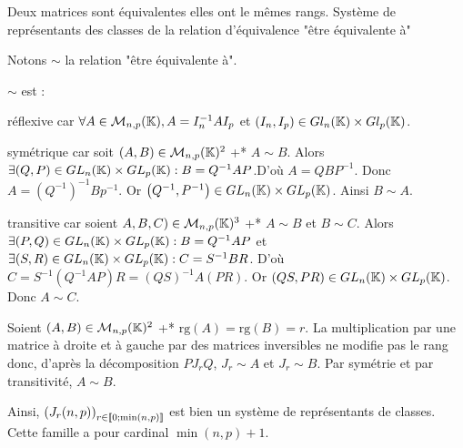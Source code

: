 \documentclass{article}
\begin{document}
\begin{question_kholle}[{
				Soient $(A, B) \in \mathcal{M}_{n, p}(\mathbb{K})^2$. $A$ est équivalente à $B$ s'il existe $(P, Q) \in GL_n(\K) \times GL_p(\K)$ \tq* $B = Q^{-1} A P$.

				Montrons que deux matrices sont équivalentes \ssi elles ont le mêmes rangs, que "être équivalente à" est une relation d'équivalence, qu'il y a $\min(n, p) + 1$ classes et que $\left(J_r(n, p)\right)_{r \in \lient 0; \min(n, p) \rient}$ est un système de représentants de classes.
			}]
	{Deux matrices sont équivalentes \ssi elles ont le mêmes rangs. Système de représentants des classes de la relation d'équivalence "être équivalente à"}

	Notons $\sim$ la relation "être équivalente à".

	$\sim$ est :
	\begin{liste}
		\item réflexive car $\forall A \in \mathcal{M}_{n, p}(\mathbb K), A = I_n^{-1} A I_p$ et $(I_n, I_p) \in Gl_n(\mathbb K) \times Gl_p(\mathbb K)$.
		\item symétrique car soit $(A, B) \in \mathcal{M}_{n, p}(\mathbb K)^2$ \tq+* $A \sim B$.
		Alors $\exists (Q, P) \in GL_n(\mathbb K) \times GL_p(\mathbb K) : B = Q^{-1} A P$.D'où $A = Q B P^{-1}$.
		Donc $A = \left(Q^{-1}\right)^{-1} B p^{-1}$.
		Or $\left(Q^{-1}, P^{-1}\right) \in GL_n(\mathbb K) \times GL_p(\mathbb K)$. Ainsi $B \sim A$.
		\item transitive car soient $A, B, C) \in \mathcal{M}_{n, p}(\mathbb K)^3$ \tq+* $A \sim B$ et $B \sim C$.
		Alors $\exists (P, Q) \in GL_n(\mathbb K) \times GL_p(\mathbb K) : B = Q^{-1} A P$ et $\exists (S, R) \in GL_n(\mathbb K) \times GL_p(\mathbb K) : C = S^{-1} B R$.
		D'où $C = S^{-1} \left(Q^{-1} A P\right) R = (QS)^{-1} A (PR)$.
		Or $(QS, PR) \in GL_n(\mathbb K) \times GL_p(\mathbb K)$.
		Donc $A \sim C$.
	\end{liste}

	Soient $(A, B) \in \mathcal{M}_{n, p}(\mathbb K)^2$ \tq+* $\mathrm{rg}(A) = \mathrm{rg}(B) = r$.
	La multiplication par une matrice à droite et à gauche par des matrices inversibles ne modifie pas le rang donc, d'après la décomposition $P J_r Q$, $J_r \sim A$ et $J_r \sim B$.
	Par symétrie et par transitivité, $A \sim B$.

	Ainsi, $\left(J_r(n, p)\right)_{r \in \lient 0; \min(n, p) \rient}$ est bien un système de représentants de classes.
	Cette famille a pour cardinal $\min(n, p) + 1$.
\end{question_kholle}
\end{document}
